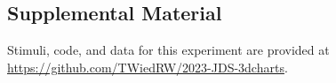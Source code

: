 \documentclass[letterpaper,inpress,dvipsnames]{jdsart}
\begin{document}
\hypertarget{supplemental-material}{%
\subsection{Supplemental Material}\label{supplemental-material}}

Stimuli, code, and data for this experiment are provided at \url{https://github.com/TWiedRW/2023-JDS-3dcharts}.



\end{document}
